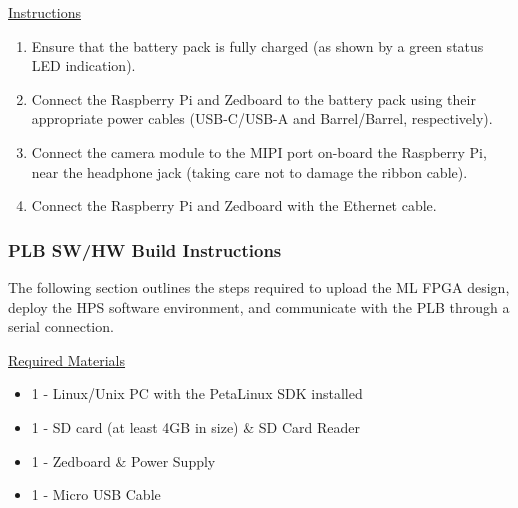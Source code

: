 \documentclass[10pt,letterpaper]{article}
\begin{document}
\underline{Instructions}
\begin{enumerate}
\item Ensure that the battery pack is fully charged (as shown by a green status LED indication).
\item Connect the Raspberry Pi and Zedboard to the battery pack using their appropriate power cables (USB-C/USB-A and Barrel/Barrel, respectively).
\item Connect the camera module to the MIPI port on-board the Raspberry Pi, near the headphone jack (taking care not to damage the ribbon cable).
\item Connect the Raspberry Pi and Zedboard with the Ethernet cable.
\end{enumerate}

\subsubsection{PLB SW/HW Build Instructions}
\label{plb_setup}
The following section outlines the steps required to upload the ML FPGA design, deploy the HPS software environment, and communicate with the PLB through a serial connection.

\underline{Required Materials}
\begin{itemize}
\item 1 - Linux/Unix PC with the PetaLinux SDK\cite{petalinux} installed
\item 1 - SD card (at least 4GB in size) \& SD Card Reader
\item 1 - Zedboard \& Power Supply
\item 1 - Micro USB Cable
\end{itemize}
\end{document}
